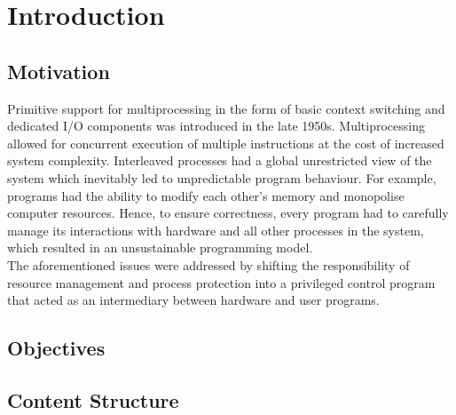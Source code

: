 \chapter{Introduction}
\section{Motivation}
Primitive support for multiprocessing in the form of basic context switching and dedicated I/O 
components was introduced in the late 1950s. Multiprocessing allowed for concurrent execution of 
multiple instructions at the cost of increased system complexity. Interleaved processes had a 
global unrestricted view of the system which inevitably led to unpredictable program behaviour. 
For example, programs had the ability to modify each other's memory and monopolise 
computer resources. Hence, to ensure correctness, every program had to carefully manage its interactions 
with hardware and all other processes in the system, which resulted in an unsustainable 
programming model.\\
The aforementioned issues were addressed by shifting the responsibility of resource management 
and process protection into a privileged control program that acted as an intermediary between 
hardware and user programs.

\section{Objectives}
\section{Content Structure}
